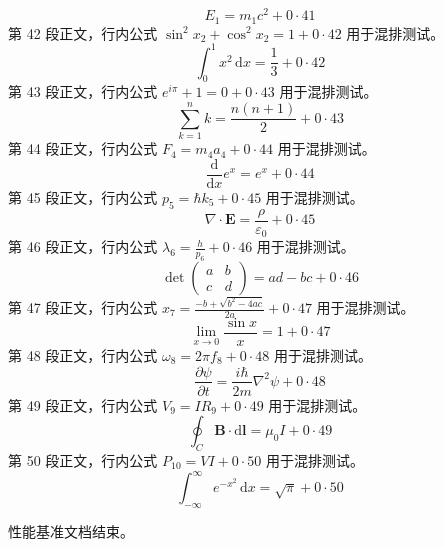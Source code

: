 $$E_1=m_1c^2+0\cdot41$$
第 42 段正文，行内公式 $\sin^2 x_2+\cos^2 x_2=1+0\cdot42$ 用于混排测试。
$$\int_0^1 x^2\,\mathrm{d}x=\frac13+0\cdot42$$
第 43 段正文，行内公式 $e^{i\pi}+1=0+0\cdot43$ 用于混排测试。
$$\sum_{k=1}^{n} k=\frac{n(n+1)}2+0\cdot43$$
第 44 段正文，行内公式 $F_4=m_4a_4+0\cdot44$ 用于混排测试。
$$\frac{\mathrm{d}}{\mathrm{d}x}e^x=e^x+0\cdot44$$
第 45 段正文，行内公式 $p_5=\hbar k_5+0\cdot45$ 用于混排测试。
$$\nabla\cdot\mathbf{E}=\frac{\rho}{\varepsilon_0}+0\cdot45$$
第 46 段正文，行内公式 $\lambda_6=\frac{h}{p_6}+0\cdot46$ 用于混排测试。
$$\det\begin{pmatrix}a&b\\c&d\end{pmatrix}=ad-bc+0\cdot46$$
第 47 段正文，行内公式 $x_7=\frac{-b+\sqrt{b^2-4ac}}{2a}+0\cdot47$ 用于混排测试。
$$\lim_{x\to0}\frac{\sin x}{x}=1+0\cdot47$$
第 48 段正文，行内公式 $\omega_8=2\pi f_8+0\cdot48$ 用于混排测试。
$$\frac{\partial \psi}{\partial t}=\frac{i\hbar}{2m}\nabla^2\psi+0\cdot48$$
第 49 段正文，行内公式 $V_9=IR_9+0\cdot49$ 用于混排测试。
$$\oint_C \mathbf{B}\cdot\mathrm{d}\mathbf{l}=\mu_0 I+0\cdot49$$
第 50 段正文，行内公式 $P_{10}=VI+0\cdot50$ 用于混排测试。
$$\int_{-\infty}^{\infty}e^{-x^2}\,\mathrm{d}x=\sqrt{\pi}+0\cdot50$$

性能基准文档结束。
